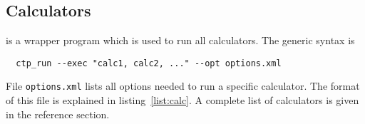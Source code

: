 \subsection{Calculators}
\label{sec:calculators}

\ctprun is a wrapper program which is used to run all calculators. The generic syntax is 
\begin{verbatim}
  ctp_run --exec "calc1, calc2, ..." --opt options.xml
\end{verbatim}
%
File \texttt{options.xml} lists all options needed to run a specific calculator. The format of this file is explained in listing~\ref{list:calc}. A complete list of calculators is given in the  reference section.
%


